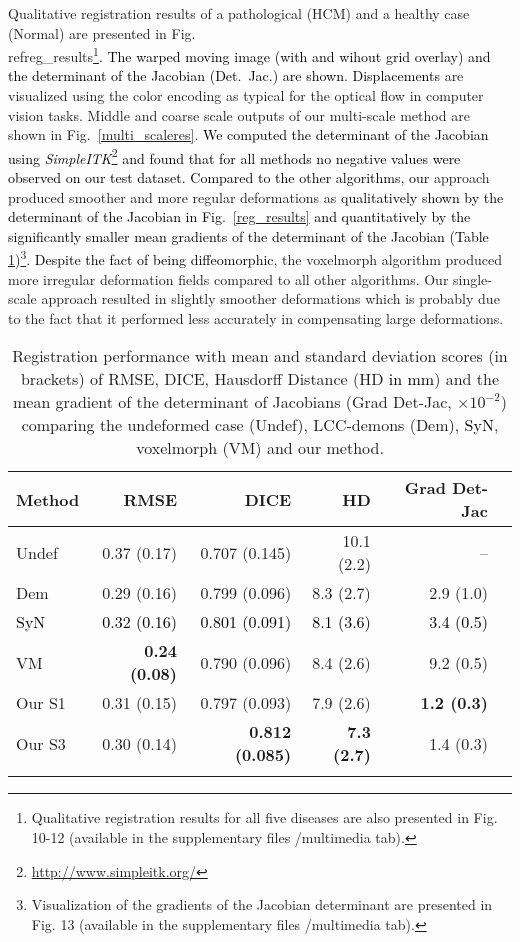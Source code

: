 \documentclass[journal]{IEEEtran}
\newcommand{\update}[1]{\textcolor{black}{#1}}
\begin{document}
Qualitative registration results of a pathological (HCM) and a healthy case (Normal) are presented in Fig.\\ref{reg_results}\update{\footnote{Qualitative registration results for all five diseases are also presented in Fig. 10-12 (available in the supplementary files /multimedia tab).}. The warped moving image (with and wihout grid overlay) and  the determinant of the Jacobian (Det.~Jac.) are shown. Displacements} are visualized using the color encoding as typical for the optical flow in computer vision tasks. Middle and coarse scale outputs of our multi-scale method are shown in Fig.~\ref{multi_scaleres}. \update{We computed the determinant of the Jacobian using \emph{SimpleITK}\footnote{\update{\url{http://www.simpleitk.org/}}} and found that for all methods no negative values were observed on our test dataset. Compared to the other algorithms, our} approach produced smoother and more regular deformations as \update{qualitatively shown by the determinant of the Jacobian in Fig.~\ref{reg_results} and quantitatively by the significantly smaller mean gradients of the determinant of the Jacobian (Table \ref{resultTable})\update{\footnote{Visualization of the gradients of the Jacobian determinant are presented in Fig. 13 (available in the supplementary files /multimedia tab).}}. Despite the fact of being diffeomorphic}, the voxelmorph algorithm produced more irregular deformation fields compared to all other algorithms. Our single-scale approach resulted in slightly smoother deformations which is probably due to the fact that it performed less accurately in compensating large deformations. 

\begin{table}[ht]
\centering
\caption{\small{Registration performance with mean and standard deviation scores (in brackets) of RMSE, DICE, Hausdorff Distance (HD \update{in mm}) and the mean gradient of the determinant of Jacobians (Grad Det-Jac, $\times 10^{-2}$) comparing the undeformed case (Undef), LCC-demons (Dem), \update{SyN}, voxelmorph (VM) and our method.}}\label{resultTable}
\begin{tabular}{l|rrrrr}
Method & RMSE & DICE & HD & Grad Det-Jac \\
\hline
Undef & 0.37 (0.17) & 0.707 (0.145) & 10.1 (2.2) & --\\ %
Dem & 0.29 (0.16) & 0.799 (0.096) & 8.3 (2.7) & 2.9 (1.0) \\ %
\update{SyN} & \update{0.32 (0.16)} &\update{0.801 (0.091)} & \update{8.1 (3.6)} &\update{3.4 (0.5)} \\
VM & \bf{0.24 (0.08)} & 0.790 (0.096) & 8.4 (2.6) & 9.2 (0.5) \\ %
Our S1 & 0.31 (0.15) & 0.797 (0.093) & 7.9 (2.6) & \bf{1.2 (0.3)} \\ %
Our S3 & 0.30 (0.14) & \bf{0.812 (0.085)} & \bf{7.3 (2.7)} & 1.4 (0.3)\\ %
\noalign{\smallskip}
\hline
\end{tabular}
\end{table}
\end{document}

